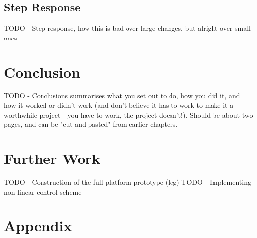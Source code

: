 \documentclass[11pt,a4paper]{article}
\begin{document}
\subsection{Step Response}
\label{sub:step_response}
TODO - Step response, how this is bad over large changes, but alright over small ones

\newpage
\section{Conclusion}
\label{sec:conclusion}

\newline TODO - Conclusions summarises what you set out to do, how you did it, and how it worked or didn't work (and don't believe it has to work to make it a worthwhile project - you
have to work, the project doesn't!). Should be about two pages, and can be "cut and
pasted" from earlier chapters.


\newpage
\section{Further Work}
\label{sec:further}

\newline TODO - Construction of the full platform prototype (leg)
\newline TODO - Implementing non linear control scheme

\newpage

\section{Appendix}
\label{sec:appendix}
\end{document}
